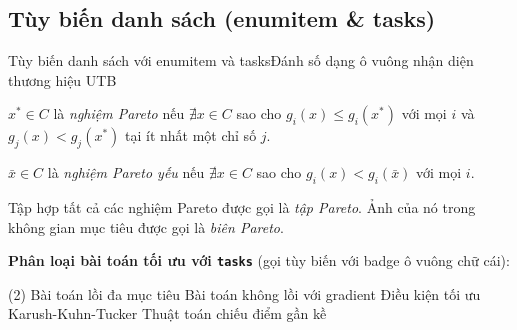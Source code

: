 \documentclass[aspectratio=169,10pt]{beamer}
\begin{document}
\subsection{Tùy biến danh sách (enumitem \& tasks)}
\begin{frame}{Tùy biến danh sách với enumitem và tasks}{Đánh số dạng ô vuông nhận diện thương hiệu UTB}
  \begin{definition}
    \begin{utbsqlist}
      \item $x^* \in C$ là \emph{nghiệm Pareto} nếu $\nexists x \in C$ sao cho $g_i(x) \le g_i(x^*)$ với mọi $i$ và $g_j(x) < g_j(x^*)$ tại ít nhất một chỉ số $j$. \label{def:pareto}
      \item $\bar{x} \in C$ là \emph{nghiệm Pareto yếu} nếu $\nexists x \in C$ sao cho $g_i(x) < g_i(\bar{x})$ với mọi $i$.
      \item Tập hợp tất cả các nghiệm Pareto được gọi là \emph{tập Pareto}. Ảnh của nó trong không gian mục tiêu được gọi là \emph{biên Pareto}.
    \end{utbsqlist}
  \end{definition}
  \vskip 2pt
  \textbf{Phân loại bài toán tối ưu với \texttt{tasks}} (gọi tùy biến với badge ô vuông chữ cái):
  \begin{tasks}[label=\utbitemsq{\alph*}, label-width=18pt, item-indent=22pt, label-format={\bfseries\color{white}}](2)
    \task Bài toán lồi đa mục tiêu
    \task Bài toán không lồi với gradient
    \task Điều kiện tối ưu Karush-Kuhn-Tucker
    \task Thuật toán chiếu điểm gần kề
  \end{tasks}
\end{frame}
\end{document}
